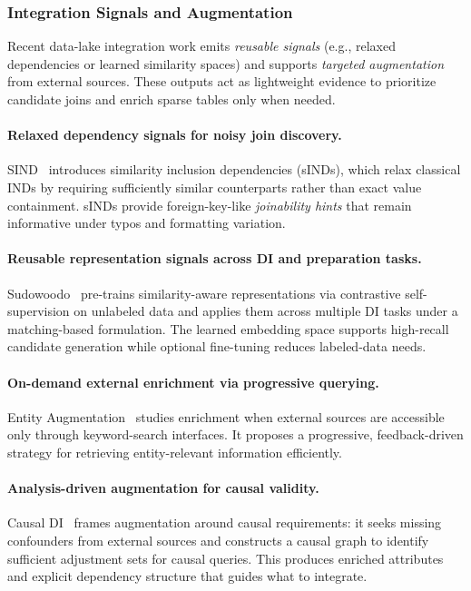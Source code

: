 \documentclass[sigconf,nonacm]{acmart}
\begin{document}
\subsubsection{Integration Signals and Augmentation}
\label{sec:integration-signals}

Recent data-lake integration work emits \emph{reusable signals} (e.g., relaxed dependencies or learned similarity spaces) and supports \emph{targeted augmentation}
from external sources. These outputs act as lightweight evidence to prioritize candidate joins and enrich sparse tables only when needed.

\paragraph{Relaxed dependency signals for noisy join discovery.}
SIND~\cite{10.1145/3588929} introduces similarity inclusion dependencies (sINDs), which relax classical INDs by requiring sufficiently similar counterparts rather than exact value containment. sINDs provide foreign-key-like \emph{joinability hints} that remain informative under typos and formatting variation.

\paragraph{Reusable representation signals across DI and preparation tasks.}
Sudowoodo~\cite{10184556} pre-trains similarity-aware representations via contrastive self-supervision on unlabeled data and applies them across multiple DI tasks under a matching-based formulation. The learned embedding space supports high-recall candidate generation while optional fine-tuning reduces labeled-data needs.

\paragraph{On-demand external enrichment via progressive querying.}
Entity Augmentation~\cite{10.14778/3611479.3611535} studies enrichment when external sources are accessible only through keyword-search interfaces. It proposes a progressive, feedback-driven strategy for retrieving entity-relevant information efficiently.

\paragraph{Analysis-driven augmentation for causal validity.}
Causal DI~\cite{10.14778/3603581.3603602} frames augmentation around causal requirements: it seeks missing confounders from external sources and constructs a causal graph to identify sufficient adjustment sets for causal queries. This produces enriched attributes and explicit dependency structure that guides what to integrate.
\end{document}

